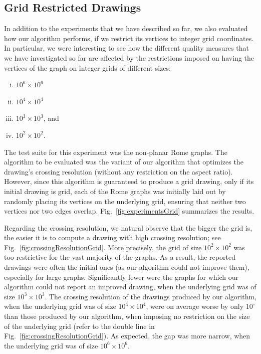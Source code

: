 \documentclass{comjnl}
\begin{document}
\subsection{Grid Restricted Drawings}
\label{ssec:grid}

In addition to the experiments that we have described so far, we also evaluated how our algorithm performs, if we restrict its vertices to integer grid coordinates. In particular, we were interesting to see how the different quality measures that we have investigated so far are affected by the restrictions imposed on having the vertices of the graph on integer grids of different sizes:

\begin{enumerate}[(i)]
\item $10^6 \times 10^6$
\item $10^4 \times 10^4$
\item $10^3 \times 10^3$, and
\item $10^2 \times 10^2$.
\end{enumerate}

The test suite for this experiment was the non-planar Rome graphs. The algorithm to be evaluated was the variant of our algorithm that optimizes the drawing's crossing resolution (without any restriction on the aspect ratio). However, since this algorithm is guaranteed to produce a grid drawing, only if its initial drawing is grid, each of the Rome graphs was initially laid out by randomly placing its vertices on the underlying grid, ensuring that neither two vertices nor two edges overlap. Fig.~\ref{fig:experimentsGrid} summarizes the results.

Regarding the crossing resolution, we natural observe that the bigger the grid is, the easier it is to compute a drawing with high crossing resolution; see Fig.~\ref{fig:crossingResolutionGrid}. More precisely, the grid of size $10^2 \times 10^2$ was too restrictive for the vast majority of the graphs. As a result, the reported drawings were often the initial ones (as our algorithm could not improve them), especially for large graphs. Significantly fewer were the graphs for which our algorithm could not report an improved drawing, when the underlying grid was of size $10^3 \times 10^3$. The crossing resolution of the drawings produced by our algorithm, when the underlying grid was of size $10^4 \times 10^4$, were on average worse by only $10^\circ$ than those produced by our algorithm, when imposing no restriction on the size of the underlying grid (refer to the double line in Fig.~\ref{fig:crossingResolutionGrid}). As expected, the gap was more narrow, when the underlying grid was of size $10^6 \times 10^6$.
\end{document}
